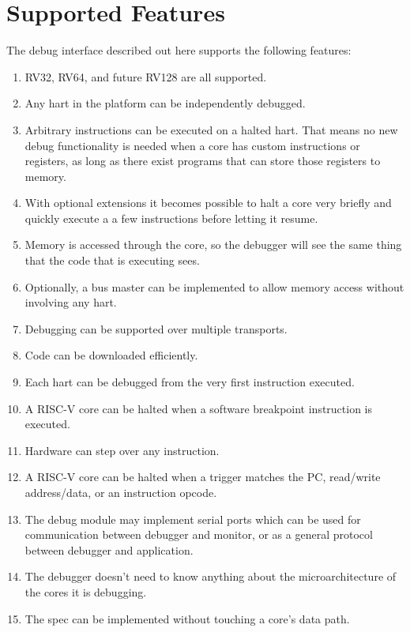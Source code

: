 \documentclass{article}
\begin{document}
\section{Supported Features}
The debug interface described out here supports the following features:
\begin{enumerate}
   \item RV32, RV64, and future RV128 are all supported.
   \item Any hart in the platform can be independently debugged.
   \item Arbitrary instructions can be executed on a halted hart. That means no
       new debug functionality is needed when a core has custom instructions or
       registers, as long as there exist programs that can store those
       registers to memory.
   \item With optional extensions it becomes possible to halt a core very
       briefly and quickly execute a a few instructions before letting it
       resume.
   \item Memory is accessed through the core, so the debugger will see the same
       thing that the code that is executing sees.
   \item Optionally, a bus master can be implemented to allow memory access
       without involving any hart.
   \item Debugging can be supported over multiple transports.
   \item Code can be downloaded efficiently.
   \item Each hart can be debugged from the very first instruction executed.
   \item A RISC-V core can be halted when a software breakpoint instruction is
       executed.
   \item Hardware can step over any instruction.
   \item A RISC-V core can be halted when a trigger matches the PC, read/write
       address/data, or an instruction opcode.
   \item The debug module may implement serial ports which can be used for
       communication between debugger and monitor, or as a general protocol
       between debugger and application.
   \item The debugger doesn't need to know anything about the microarchitecture
       of the cores it is debugging.
   \item The spec can be implemented without touching a core's data path.
\end{enumerate}
\end{document}
